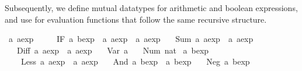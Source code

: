 \begin{isabellebody}
\begin{isamarkuptext}
\begin{description}
  \end{description}%
\end{isamarkuptext}%
\isamarkuptrue%
%
\isamarkuptrue%
%
\begin{isamarkuptext}%
Subsequently, we define mutual datatypes for arithmetic and
  boolean expressions, and use \hyperlink{command.primrec}{\mbox{}} for evaluation
  functions that follow the same recursive structure.%
\end{isamarkuptext}%
\isamarkuptrue%
\isamarkupfalse%
\ {}a\ aexp\ {}\isanewline
\ \ \ \ IF\ {}{}a\ bexp{}\ \ {}{}a\ aexp{}\ \ {}{}a\ aexp{}\isanewline
\ \ {}\ Sum\ {}{}a\ aexp{}\ \ {}{}a\ aexp{}\isanewline
\ \ {}\ Diff\ {}{}a\ aexp{}\ \ {}{}a\ aexp{}\isanewline
\ \ {}\ Var\ {}a\isanewline
\ \ {}\ Num\ nat\isanewline
{}\ {}a\ bexp\ {}\isanewline
\ \ \ \ Less\ {}{}a\ aexp{}\ \ {}{}a\ aexp{}\isanewline
\ \ {}\ And\ {}{}a\ bexp{}\ \ {}{}a\ bexp{}\isanewline
\ \ {}\ Neg\ {}{}a\ bexp{}%

\end{isabellebody}
